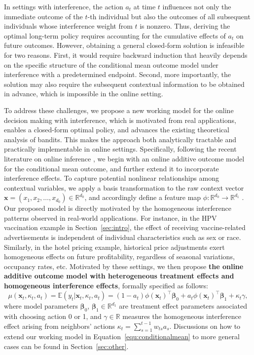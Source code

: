 \documentclass[12pt]{article}
\begin{document}
In settings with interference, the action $a_t$ at time $t$ influences not only the immediate outcome of the $t$-th individual but also the outcomes of all subsequent individuals whose interference weight from $t$ is nonzero. Thus, deriving the optimal long-term policy requires accounting for the cumulative effects of $a_t$ on future outcomes. However, obtaining a general closed-form solution is infeasible for two reasons. First, it would require backward induction that heavily depends on the specific structure of the conditional mean outcome model under interference with a predetermined endpoint. Second, more importantly, the solution may also require the subsequent contextual information to be obtained in advance, which is impossible in the online setting. 

To address these challenges, we propose a new working model for the online decision making with interference, which is motivated from real applications, enables a closed-form optimal policy, and advances the existing theoretical analysis of bandits. This makes the approach both analytically tractable and practically implementable in online settings. Specifically, following the recent literature on online inference \citep{deshpande2018,zhang2020,chen2021,shen2024,xu2024}, we begin with an online additive outcome model for the conditional mean outcome, and further extend it to incorporate interference effects. To capture potential nonlinear relationships among contextual variables, we apply a basis transformation to the raw context vector \( \bm{x} = (x_1, x_2, \ldots, x_{d_0}) \in \mathbb{R}^{d_0} \), and accordingly define a feature map $\phi: \mathbb{R}^{d_0} \rightarrow \mathbb{R}^{d_1}$ \citep{shi2020breaking,papini2021leveraging,dubey2022scalable}. 
Our proposed model is directly motivated by the homogeneous interference patterns observed in real-world applications. For instance, in the HPV vaccination example in Section~\ref{sec:intro}, the effect of receiving vaccine-related advertisements is independent of individual characteristics such as sex or race. Similarly, in the hotel pricing example, historical price adjustments exert homogeneous effects on future profitability, regardless of seasonal variations, occupancy rates, etc.
Motivated by these settings, we then propose \textbf{the online additive outcome model with heterogeneous treatment effects and homogeneous interference effects}, formally specified as follows:
\begin{equation}
\label{equ:conditionalmean}
   \mu(\bm{x}_t,  \kappa_t, a_t) = \mathbb{E}(y_t \vert \bm{x}_t,  \kappa_t, a_t) = (1-a
   _t)\phi(\bm{x}_t)^{\top}\bm{\beta}_0+a_t\phi(\bm{x}_t)^{\top}\bm{\beta}_1+ \kappa_t \gamma,
\end{equation}
where model parameters $\bm{\beta}_0$, $\bm{\beta}_1 \in \mathbb{R}^{d_1}$ are treatment effect parameters associated with choosing action 0 or 1, and $\gamma \in \mathbb{R}$ measures the homogeneous interference effect arising from neighbors' actions $\kappa_t = \sum_{s=1}^{t-1} w_{ts} a_s$. Discussions on how to extend our working model in Equation~\eqref{equ:conditionalmean} to more general cases can be found in Section~\ref{sec:other}. 
\end{document}
